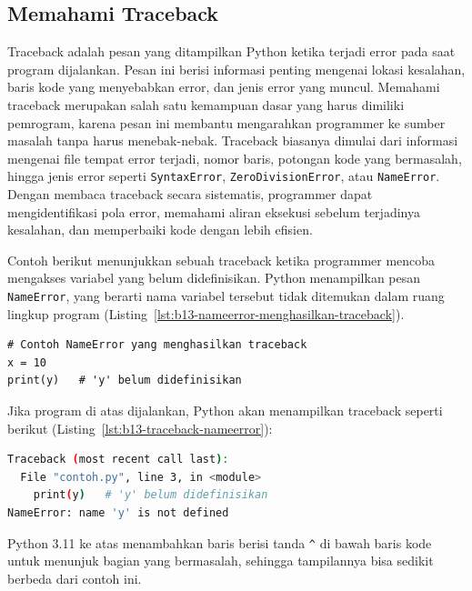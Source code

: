 \subsection{Memahami Traceback}

Traceback adalah pesan yang ditampilkan Python ketika terjadi error pada saat program dijalankan. Pesan ini berisi informasi penting mengenai lokasi kesalahan, baris kode yang menyebabkan error, dan jenis error yang muncul. Memahami traceback merupakan salah satu kemampuan dasar yang harus dimiliki pemrogram, karena pesan ini membantu mengarahkan programmer ke sumber masalah tanpa harus menebak-nebak. Traceback biasanya dimulai dari informasi mengenai file tempat error terjadi, nomor baris, potongan kode yang bermasalah, hingga jenis error seperti \texttt{SyntaxError}, \texttt{ZeroDivisionError}, atau \texttt{NameError}. Dengan membaca traceback secara sistematis, programmer dapat mengidentifikasi pola error, memahami aliran eksekusi sebelum terjadinya kesalahan, dan memperbaiki kode dengan lebih efisien.

Contoh berikut menunjukkan sebuah traceback ketika programmer mencoba mengakses variabel yang belum didefinisikan. Python menampilkan pesan \texttt{NameError}, yang berarti nama variabel tersebut tidak ditemukan dalam ruang lingkup program (Listing~\ref{lst:b13-nameerror-menghasilkan-traceback}).

\begin{lstlisting}[style=PythonStyle, caption={Contoh NameError yang menghasilkan traceback}, label={lst:b13-nameerror-menghasilkan-traceback}]
# Contoh NameError yang menghasilkan traceback
x = 10
print(y)   # 'y' belum didefinisikan
\end{lstlisting}

Jika program di atas dijalankan, Python akan menampilkan traceback seperti berikut (Listing~\ref{lst:b13-traceback-nameerror}):

\begin{lstlisting}[language=bash, caption={Traceback untuk NameError}, label={lst:b13-traceback-nameerror}]
Traceback (most recent call last):
  File "contoh.py", line 3, in <module>
    print(y)   # 'y' belum didefinisikan
NameError: name 'y' is not defined
\end{lstlisting}

Python 3.11 ke atas menambahkan baris berisi tanda \texttt{\^{}} di bawah baris kode untuk menunjuk bagian yang bermasalah, sehingga tampilannya bisa sedikit berbeda dari contoh ini.

